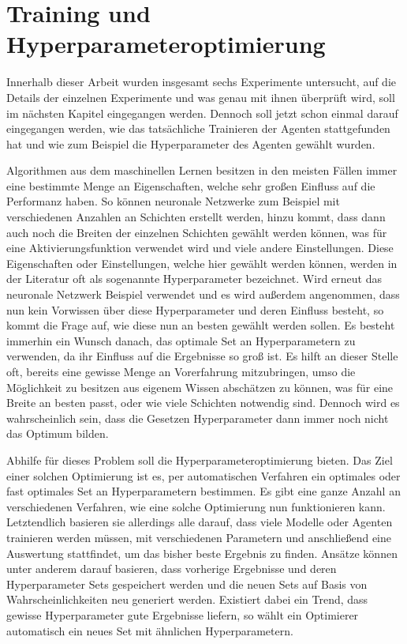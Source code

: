 \documentclass[]{iat}
\begin{document}
\section{Training und Hyperparameteroptimierung}
Innerhalb dieser Arbeit wurden insgesamt sechs Experimente untersucht, auf die Details der einzelnen Experimente und was genau mit ihnen überprüft wird, soll im nächsten Kapitel eingegangen werden. Dennoch soll jetzt schon einmal darauf eingegangen werden, wie das tatsächliche Trainieren der Agenten stattgefunden hat und wie zum Beispiel die Hyperparameter des Agenten gewählt wurden.

Algorithmen aus dem maschinellen Lernen besitzen in den meisten Fällen immer eine bestimmte Menge an Eigenschaften, welche sehr großen Einfluss auf die Performanz haben. So können neuronale Netzwerke zum Beispiel mit verschiedenen Anzahlen an Schichten erstellt werden, hinzu kommt, dass dann auch noch die Breiten der einzelnen Schichten gewählt werden können, was für eine Aktivierungsfunktion verwendet wird und viele andere Einstellungen. Diese Eigenschaften oder Einstellungen, welche hier gewählt werden können, werden in der Literatur oft als sogenannte Hyperparameter bezeichnet. Wird erneut das neuronale Netzwerk Beispiel verwendet und es wird außerdem angenommen, dass nun kein Vorwissen über diese Hyperparameter und deren Einfluss besteht, so kommt die Frage auf, wie diese nun an besten gewählt werden sollen. Es besteht immerhin ein Wunsch danach, das optimale Set an Hyperparametern zu verwenden, da ihr Einfluss auf die Ergebnisse so groß ist. Es hilft an dieser Stelle oft, bereits eine gewisse Menge an Vorerfahrung mitzubringen, umso die Möglichkeit zu besitzen aus eigenem Wissen abschätzen zu können, was für eine Breite an besten passt, oder wie viele Schichten notwendig sind. Dennoch wird es wahrscheinlich sein, dass die Gesetzen Hyperparameter dann immer noch nicht das Optimum bilden.

Abhilfe für dieses Problem soll die Hyperparameteroptimierung bieten. Das Ziel einer solchen Optimierung ist es, per automatischen Verfahren ein optimales oder fast optimales Set an Hyperparametern bestimmen. Es gibt eine ganze Anzahl an verschiedenen Verfahren, wie eine solche Optimierung nun funktionieren kann. Letztendlich basieren sie allerdings alle darauf, dass viele Modelle oder Agenten trainieren werden müssen, mit verschiedenen Parametern und anschließend eine Auswertung stattfindet, um das bisher beste Ergebnis zu finden. Ansätze können unter anderem darauf basieren, dass vorherige Ergebnisse und deren Hyperparameter Sets gespeichert werden und die neuen Sets auf Basis von Wahrscheinlichkeiten neu generiert werden. Existiert dabei ein Trend, dass gewisse Hyperparameter gute Ergebnisse liefern, so wählt ein Optimierer automatisch ein neues Set mit ähnlichen Hyperparametern.
\end{document}

